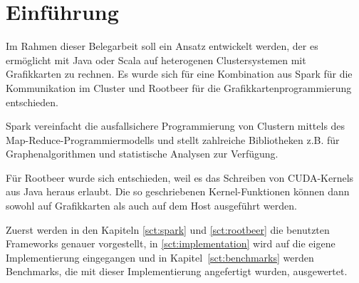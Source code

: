 \chapter{Einführung}

Im Rahmen dieser Belegarbeit soll ein Ansatz entwickelt werden, der es ermöglicht mit Java oder Scala auf heterogenen Clustersystemen mit Grafikkarten zu rechnen. Es wurde sich für eine Kombination aus Spark für die Kommunikation im Cluster und Rootbeer für die Grafikkartenprogrammierung entschieden.

Spark vereinfacht die ausfallsichere Programmierung von Clustern mittels des Map-Reduce-Programmiermodells und stellt zahlreiche Bibliotheken z.B. für Graphenalgorithmen und statistische Analysen zur Verfügung.

Für Rootbeer wurde sich entschieden, weil es das Schreiben von CUDA-Kernels aus Java heraus erlaubt. Die so geschriebenen Kernel-Funktionen können dann sowohl auf Grafikkarten als auch auf dem Host ausgeführt werden.

Zuerst werden in den Kapiteln \ref{sct:spark} und \ref{sct:rootbeer} die benutzten Frameworks genauer vorgestellt, in \autoref{sct:implementation} wird auf die eigene Implementierung eingegangen und in Kapitel~\ref{sct:benchmarks} werden Benchmarks, die mit dieser Implementierung angefertigt wurden, ausgewertet.
